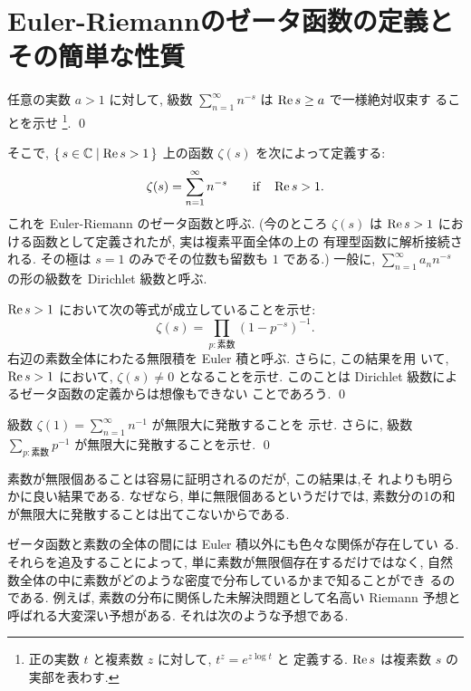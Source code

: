 \documentclass[12pt,twoside]{jarticle}
\begin{document}

\section{Euler-Riemannのゼータ函数の定義とその簡単な性質}

\begin{question}
  任意の実数 $a > 1$ に対して, 
  級数 $\sum_{n=1}^{\infty}n^{-s}$ は $\mathop{\mathrm{Re}}\nolimits s \ge a$ で一様絶対収束す
  ることを示せ%
  \footnote{正の実数 $t$ と複素数 $z$ に対して, $t^z = e^{z\log t}$ と
    定義する. $\mathop{\mathrm{Re}}\nolimits s$ は複素数 $s$ の実部を表わす.}. %
  \qed
\end{question}

\noindent そこで, $\{\,s\in{\mathbb C} \mid \mathop{\mathrm{Re}}\nolimits s > 1\,\}$ 上の函数 
$\zeta(s)$ を次によって定義する:
\[
  \zeta(s) = \sum_{n=1}^{\infty}n^{-s}
  \qquad \text{if} \quad \mathop{\mathrm{Re}}\nolimits s > 1.
\]%
これを Euler-Riemann のゼータ函数と呼ぶ. (今のところ $\zeta(s)$ は 
$\mathop{\mathrm{Re}}\nolimits s > 1$ における函数として定義されたが, 実は複素平面全体の上の
有理型函数に解析接続される. その極は $s=1$ のみでその位数も留数も $1$ 
である.) 一般に, $\sum_{n=1}^{\infty} a_n n^{-s}$ の形の級数を 
Dirichlet 級数と呼ぶ.

\begin{question}[Euler積]\qstar{*}
  $\mathop{\mathrm{Re}}\nolimits s > 1$ において次の等式が成立していることを示せ:
  \[
    \zeta(s) = \prod_{p:\text{素数}} (1 - p^{-s})^{-1}.
  \]%
  右辺の素数全体にわたる無限積を Euler 積と呼ぶ. さらに, この結果を用
  いて, $\mathop{\mathrm{Re}}\nolimits s > 1$ において, $\zeta(s) \ne 0$ となることを示せ.
  このことは Dirichlet 級数によるゼータ函数の定義からは想像もできない
  ことであろう.  \qed
\end{question}

\begin{question}
  級数 $\zeta(1) = \sum_{n=1}^{\infty}n^{-1}$ が無限大に発散することを
  示せ. さらに, 級数 
  \(
    \displaystyle
    \sum_{p : \text{素数}} p^{-1}
  \)
  が無限大に発散することを示せ. 
  \qed
\end{question}

\noindent 素数が無限個あることは容易に証明されるのだが, この結果は,そ
れよりも明らかに良い結果である. なぜなら, 単に無限個あるというだけでは,
素数分の1の和が無限大に発散することは出てこないからである. 

ゼータ函数と素数の全体の間には Euler 積以外にも色々な関係が存在してい
る. それらを追及することによって, 単に素数が無限個存在するだけではなく, 
自然数全体の中に素数がどのような密度で分布しているかまで知ることができ
るのである. 例えば, 素数の分布に関係した未解決問題として名高い Riemann 
予想と呼ばれる大変深い予想がある. それは次のような予想である.
\end{document}
